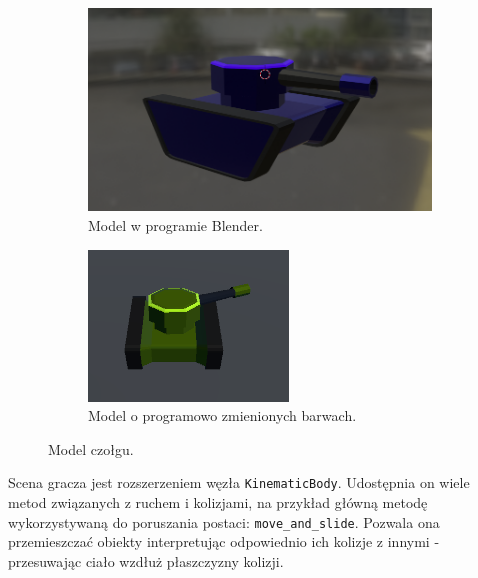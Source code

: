 \begin{figure}
\centering
    \begin{subfigure}{.7\textwidth}
        \centering
        \includegraphics[width=.8\linewidth]{Images/development/model.png}
        \caption{Model w programie Blender.}
        \label{fig:model}
    \end{subfigure}
    
    \begin{subfigure}{.7\textwidth}
        \centering
        \includegraphics[width=.8\linewidth]{Images/development/model_green.png}
        \caption{Model o programowo zmienionych barwach.}
        \label{fig:model_green}
    \end{subfigure}
    \caption{Model czołgu.}
    \label{fig:both_models}
\end{figure}

Scena gracza jest rozszerzeniem węzła \texttt{KinematicBody}. Udostępnia on wiele metod związanych z ruchem i kolizjami, na przykład główną metodę wykorzystywaną do poruszania postaci: \texttt{move\_and\_slide}. Pozwala ona przemieszczać obiekty interpretując odpowiednio ich kolizje z innymi - przesuwając ciało wzdłuż płaszczyzny kolizji.


